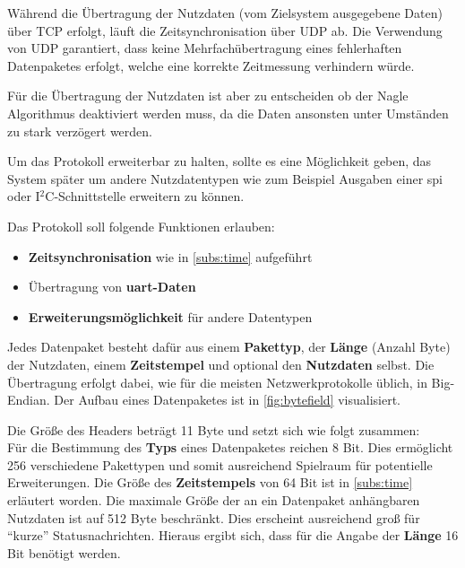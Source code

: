 Während die Übertragung der Nutzdaten (vom Zielsystem ausgegebene Daten) über
TCP erfolgt, läuft die Zeitsynchronisation über UDP ab. Die Verwendung von UDP
garantiert, dass keine Mehrfachübertragung eines fehlerhaften Datenpaketes
erfolgt, welche eine korrekte Zeitmessung verhindern würde.

Für die Übertragung der Nutzdaten ist aber zu entscheiden ob der Nagle
Algorithmus\cite{RFC896} deaktiviert werden muss, da die Daten ansonsten unter
Umständen zu stark verzögert werden.

Um das Protokoll erweiterbar zu halten, sollte es eine Möglichkeit geben, das
System später um andere Nutzdatentypen wie zum Beispiel Ausgaben einer \gls{spi} oder
I$^2$C-Schnittstelle erweitern zu können.

Das Protokoll soll folgende Funktionen erlauben:
\begin{itemize}
  \item \textbf{Zeitsynchronisation} wie in \autoref{subs:time} aufgeführt
  \item Übertragung von \textbf{\gls{uart}-Daten}
  \item \textbf{Erweiterungsmöglichkeit} für andere Datentypen
\end{itemize}

Jedes Datenpaket besteht dafür aus einem \textbf{Pakettyp}, der \textbf{Länge}
(Anzahl Byte) der Nutzdaten, einem \textbf{Zeitstempel} und optional den
\textbf{Nutzdaten} selbst. Die Übertragung erfolgt dabei, wie für die meisten
Netzwerkprotokolle üblich, in Big-Endian. Der Aufbau eines Datenpaketes ist in
\autoref{fig:bytefield} visualisiert.

Die Größe des Headers beträgt 11 Byte und setzt sich wie folgt zusammen:\\
Für die Bestimmung des \textbf{Typs} eines Datenpaketes reichen 8 Bit. Dies
ermöglicht 256 verschiedene Pakettypen und somit ausreichend Spielraum für
potentielle Erweiterungen. Die Größe des \textbf{Zeitstempels} von 64 Bit ist in
\autoref{subs:time} erläutert worden. Die maximale Größe der an ein
Datenpaket anhängbaren Nutzdaten ist auf 512 Byte beschränkt. Dies erscheint
ausreichend groß für "`kurze"' Statusnachrichten. Hieraus ergibt sich, dass für
die Angabe der \textbf{Länge} 16 Bit benötigt werden.

